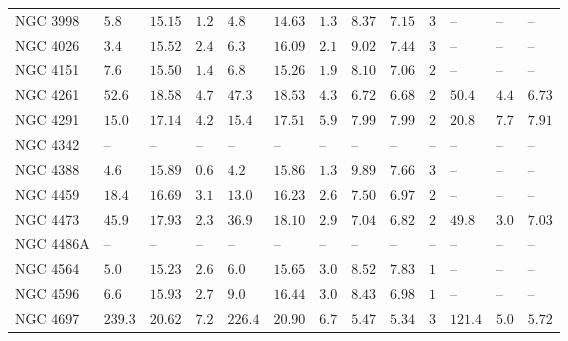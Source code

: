 \begin{table*}
\begin{center}
\begin{tabular}{lllllllllllll}
NGC 3998  \quad &  $5.8$  &  $15.15$  &  $1.2$  \quad \quad &  $4.8$  &  $14.63$  &  $1.3$  &  $8.37$  &  $7.15$  \quad \quad &  $3$  \quad \quad &   -- &   -- &   --    \\ 
NGC 4026  \quad &  $3.4$  &  $15.52$  &  $2.4$  \quad \quad &  $6.3$  &  $16.09$  &  $2.1$  &  $9.02$  &  $7.44$  \quad \quad &  $3$  \quad \quad &   -- &   -- &   --    \\ 
NGC 4151  \quad &  $7.6$  &  $15.50$  &  $1.4$  \quad \quad &  $6.8$  &  $15.26$  &  $1.9$  &  $8.10$  &  $7.06$  \quad \quad &  $2$  \quad \quad &   -- &   -- &   --    \\ 
NGC 4261  \quad &  $52.6$  &  $18.58$  &  $4.7$  \quad \quad &  $47.3$  &  $18.53$  &  $4.3$  &  $6.72$  &  $6.68$  \quad \quad &  $2$  \quad \quad &  $50.4$  &  $4.4$  &  $6.73$  \\ 
NGC 4291  \quad &  $15.0$  &  $17.14$  &  $4.2$  \quad \quad &  $15.4$  &  $17.51$  &  $5.9$  &  $7.99$  &  $7.99$  \quad \quad &  $2$  \quad \quad &  $20.8$  &  $7.7$  &  $7.91$  \\ 
NGC 4342  \quad &   -- &   -- &   -- \quad \quad &   -- &   -- &   -- &   -- &   -- \quad \quad & 
 -- \quad \quad & 
 -- &   -- &   --    \\ 
NGC 4388  \quad &  $4.6$  &  $15.89$  &  $0.6$  \quad \quad &  $4.2$  &  $15.86$  &  $1.3$  &  $9.89$  &  $7.66$  \quad \quad &  $3$  \quad \quad &   -- &   -- &   --    \\ 
NGC 4459  \quad &  $18.4$  &  $16.69$  &  $3.1$  \quad \quad &  $13.0$  &  $16.23$  &  $2.6$  &  $7.50$  &  $6.97$  \quad \quad &  $2$  \quad \quad &   -- &   -- &   --    \\ 
NGC 4473  \quad &  $45.9$  &  $17.93$  &  $2.3$  \quad \quad &  $36.9$  &  $18.10$  &  $2.9$  &  $7.04$  &  $6.82$  \quad \quad &  $2$  \quad \quad &  $49.8$  &  $3.0$  &  $7.03$  \\ 
NGC 4486A  \quad &   -- &   -- &   -- \quad \quad &   -- &   -- &   -- &   -- &   -- \quad \quad & 
 -- \quad \quad & 
 -- &   -- &   --    \\ 
NGC 4564  \quad &  $5.0$  &  $15.23$  &  $2.6$  \quad \quad &  $6.0$  &  $15.65$  &  $3.0$  &  $8.52$  &  $7.83$  \quad \quad &  $1$  \quad \quad &   -- &   -- &   --    \\ 
NGC 4596  \quad &  $6.6$  &  $15.93$  &  $2.7$  \quad \quad &  $9.0$  &  $16.44$  &  $3.0$  &  $8.43$  &  $6.98$  \quad \quad &  $1$  \quad \quad &   -- &   -- &   --    \\ 
NGC 4697  \quad &  $239.3$  &  $20.62$  &  $7.2$  \quad \quad &  $226.4$  &  $20.90$  &  $6.7$  &  $5.47$  &  $5.34$  \quad \quad &  $3$  \quad \quad &  $121.4$  &  $5.0$  &  $5.72$  \\ 

\end{tabular}
\end{center}
\end{table*}
